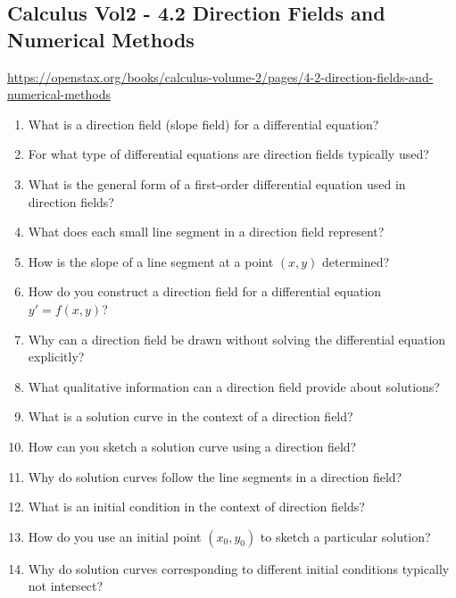 \subsection{Calculus Vol2 - 4.2 Direction Fields and Numerical Methods}

\url{https://openstax.org/books/calculus-volume-2/pages/4-2-direction-fields-and-numerical-methods}

\begin{enumerate}

\item What is a direction field (slope field) for a differential equation?

\item For what type of differential equations are direction fields typically used?

\item What is the general form of a first-order differential equation used in direction fields?

\item What does each small line segment in a direction field represent?

\item How is the slope of a line segment at a point $(x,y)$ determined?

\item How do you construct a direction field for a differential equation $y' = f(x,y)$?

\item Why can a direction field be drawn without solving the differential equation explicitly?

\item What qualitative information can a direction field provide about solutions?

\item What is a solution curve in the context of a direction field?

\item How can you sketch a solution curve using a direction field?

\item Why do solution curves follow the line segments in a direction field?

\item What is an initial condition in the context of direction fields?

\item How do you use an initial point $(x_0,y_0)$ to sketch a particular solution?

\item Why do solution curves corresponding to different initial conditions typically not intersect?


\end{enumerate}
